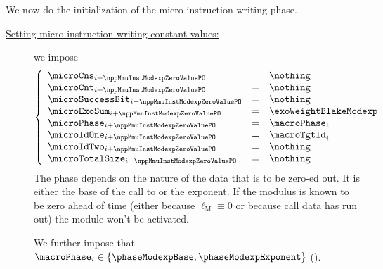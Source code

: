 \begin{center}
\end{center}
We now do the initialization of the micro-instruction-writing phase.
\begin{description}
	\item[\underline{Setting micro-instruction-writing-constant values:}]
		we impose
		\[ \left\{ \begin{array}{lcl}		
			\microCns           _{i + \nppMmuInstModexpZeroValuePO} & = & \nothing \\
			\microCnt           _{i + \nppMmuInstModexpZeroValuePO} & = & \nothing \\
			\microSuccessBit    _{i + \nppMmuInstModexpZeroValuePO} & = & \nothing \\
			\microExoSum        _{i + \nppMmuInstModexpZeroValuePO} & = & \exoWeightBlakeModexp    \\
			\microPhase         _{i + \nppMmuInstModexpZeroValuePO} & = & \macroPhase    _{i} \\
			\microIdOne         _{i + \nppMmuInstModexpZeroValuePO} & = & \macroTgtId    _{i} \\
			\microIdTwo         _{i + \nppMmuInstModexpZeroValuePO} & = & \nothing   \\
			\microTotalSize     _{i + \nppMmuInstModexpZeroValuePO} & = & \nothing \\
		\end{array} \right.
		\]
		\saNote{} 
		The phase depends on the nature of the data that is to be zero-ed out.
		It is either the base of the call to \instModexp{} or the exponent.
		If the modulus is known to be zero ahead of time (either because $\ell_\text{M} \equiv 0$ or because call data has run out) the \mmuMod{} module won't be activated.

		We further impose that $\macroPhase _{i} \in \{ \phaseModexpBase, \phaseModexpExponent \}$ (\trash).

\end{description}

